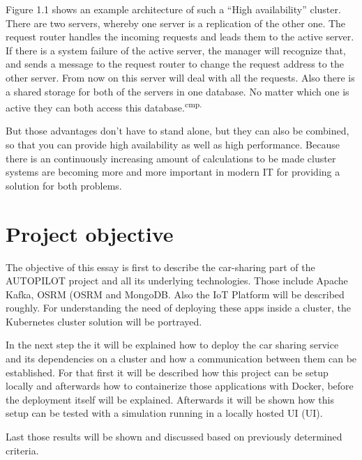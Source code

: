 Figure 1.1 shows an example architecture of such a ``High availability'' cluster. There are two servers, whereby one server is a replication of the other one. The request router handles the incoming requests and leads them to the active server. If there is a system failure of the active server, the manager will recognize that, and sends a message to the request router to change the request address to the other server. From now on this server will deal with all the requests. Also there is a shared storage for both of the servers in one database. No matter which one is active they can both access this database.\textsuperscript{cmp.\cite{10}}


But those advantages don't have to stand alone, but they can also be combined, so that you can provide high availability as well as high performance. Because there is an continuously increasing amount of calculations to be made cluster systems are becoming more and more important in modern IT for providing a solution for both problems.

\section{Project objective}

The objective of this essay is first to describe the car-sharing part of the AUTOPILOT project and all its underlying technologies. Those include Apache Kafka, \acs{OSRM} (\acl{OSRM} and MongoDB. Also the IoT Platform will be described roughly. For understanding the need of deploying these apps inside a cluster, the Kubernetes cluster solution will be portrayed.

In the next step the it will be explained how to deploy the car sharing service and its dependencies on a cluster and how a communication between them can be established. For that first it will be described how this project can be setup locally and afterwards how to containerize those applications with Docker, before the deployment itself will be explained. Afterwards it will be shown how this setup can be tested with a simulation running in a locally hosted \acs{UI} (\acl{UI}).

Last those results will be shown and discussed based on previously determined criteria. 


